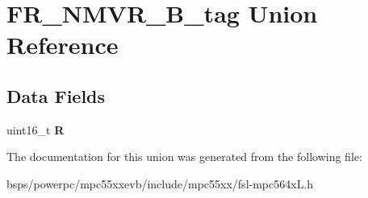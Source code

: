 \hypertarget{unionFR__NMVR__16B__tag}{}\section{F\+R\+\_\+\+N\+M\+V\+R\+\_\+B\+\_\+tag Union Reference}
\label{unionFR__NMVR__16B__tag}
\subsection*{Data Fields}
\begin{DoxyCompactItemize}
\item 
\mbox{\label{unionFR__NMVR__16B__tag_a8adae6ed7a03e789f853f80507539b4d}} 
uint16\+\_\+t {\bfseries R}
\end{DoxyCompactItemize}


The documentation for this union was generated from the following file\+:\begin{DoxyCompactItemize}
\item 
bsps/powerpc/mpc55xxevb/include/mpc55xx/fsl-\/mpc564x\+L.\+h\end{DoxyCompactItemize}
